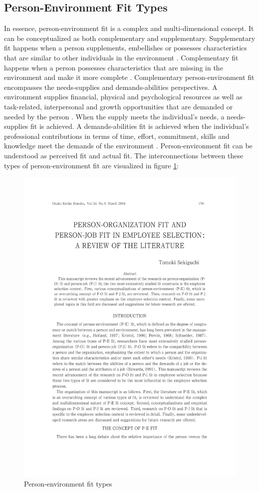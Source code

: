 \documentclass[draft,final]{thesisclass} %
\begin{document}
\subsection{Person-Environment Fit Types} \label{pef_types}
In essence, person-environment fit is a complex and multi-dimensional concept.
It can be conceptualized as both complementary and supplementary. 
Supplementary fit happens when a person supplements, embellishes or possesses characteristics that are similar to other individuals in the environment \cite[180]{po_and_pj_fit_literature_review}.
Complementary fit happens when a person possesses characteristics that are missing in the environment and make it more complete \cite[180]{po_and_pj_fit_literature_review}.
Complementary person-environment fit encompasses the needs-supplies and demands-abilities perspectives. 
A environment supplies financial, physical and psychological resources as well as task-related, interpersonal and growth opportunities that are demanded or needed by the person \cite[180]{po_and_pj_fit_literature_review}.
When the supply meets the individual's needs, a needs-supplies fit is achieved.
A demands-abilities fit is achieved when the individual's professional contributions in terms of time, effort, commitment, skills and knowledge meet the demands of the environment \cite[180]{po_and_pj_fit_literature_review}.
Person-environment fit can be understood as perceived fit and actual fit.
The interconnections between these types of person-environment fit are visualized in figure \ref{fig:person_environment_fit_types}:
\begin{figure}[H]
    \centering
    \includegraphics[scale=0.5,page=3,width=0.8\linewidth,trim={55 130 55 470},clip]{literature/po_and_pj_fit_literature_review.pdf}
    \caption{Person-environment fit types \cite[3]{po_and_pj_fit_literature_review}}
    \label{fig:person_environment_fit_types}
\end{figure}
\end{document}
